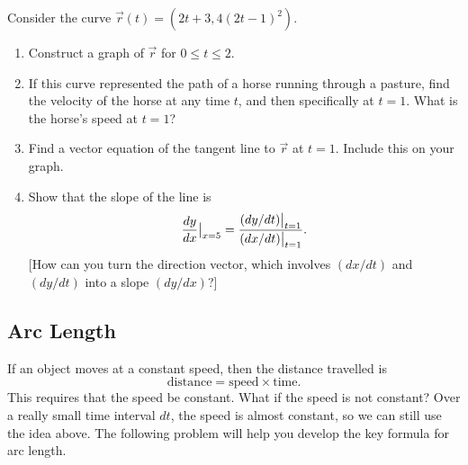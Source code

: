 \begin{problem}
Consider the curve $\vec r(t) = (2t+3, 4(2t-1)^2)$.
\begin{enumerate}
\item Construct a graph of $\vec r$ for $0\leq t\leq 2$. 
\item If this curve represented the path of a horse running through a pasture, find the velocity of the horse at any time $t$, and then specifically at $t=1$. What is the horse's speed at $t=1$?
\item Find a vector equation of the tangent line to $\vec r$ at $t=1$.  Include this on your graph.
\item Show that the slope of the line is 
$$\displaystyle \frac{dy}{dx}\big|_{x=5} 
= 
\frac{
(dy/dt)\big|_{t=1}
}{
(dx/dt)\big|_{t=1}
}.$$
[How can you turn the direction vector, which involves $(dx/dt)$ and $(dy/dt)$ into a slope $(dy/dx)$?]
\end{enumerate} 
\end{problem}
%
%

\subsection{Arc Length}\label{arc length}
If an object moves at a constant speed, then the distance travelled is 
$$\text{distance} = \text{speed}\times\text{time}.$$
This requires that the speed be constant.  What if the speed is not constant? Over a really small time interval $dt$, the speed is almost constant, so we can still use the idea above. The following problem will help you develop the key formula for arc length.


